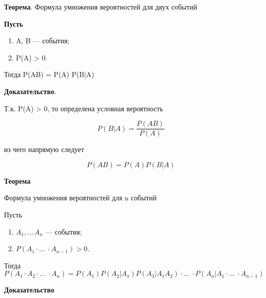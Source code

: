 \textbf{Теорема}. Формула умножения вероятностей для двух событий 

\textbf{Пусть}

\begin{enumerate}
	\item A, B --- события;
	\item P(A) > 0.
\end{enumerate}

Тогда P(AB) = P(A) P(B|A)

\textbf{Доказательство}.

Т.к. P(A) > 0, то определена условная вероятность

\begin{equation}
	P(B|A) = \frac{P(AB)}{P(A)}
\end{equation}

из чего напрямую следует

\begin{equation}
	P(AB) = P(A) P(B|A)
\end{equation}

\textbf{Теорема}

Формула умножения вероятностей для n событий

Пусть

\begin{enumerate}
	\item $A_1, \dots\, A_n$ --- события;
	\item $P(A_1 \cdot \dots\ \cdot A_{n-1}) > 0$.
\end{enumerate}

Тогда
\begin{equation}
	P(A_1 \cdot A_2 \cdot \dots\ \cdot A_n) = P(A_1)P(A_2 | A_1)P(A_3|A_1A_2) \cdot \dots\ \cdot P(A_n|A_1 \cdot \dots\ \cdot A_{n-1})
\end{equation}

\textbf{Доказательство}

